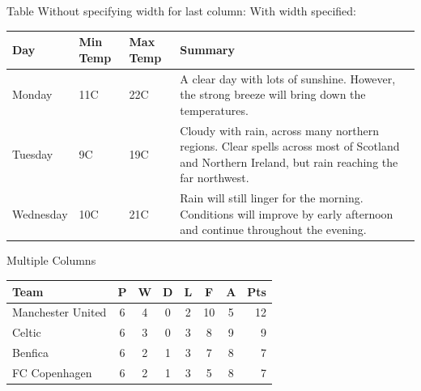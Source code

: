\documentclass[10pt,xcolor=table]{beamer}
\begin{document}
\begin{frame}{Table}
Without specifying width for last column:
With width specified:
\begin{center}
    \begin{tabular}{ | l | l | l | p{5cm} |}
    \hline
    Day & Min Temp & Max Temp & Summary \\ \hline
    Monday & 11C & 22C & A clear day with lots of sunshine.  
    However, the strong breeze will bring down the temperatures. \\ \hline
    Tuesday & 9C & 19C & Cloudy with rain, across many northern regions. Clear spells
    across most of Scotland and Northern Ireland,
    but rain reaching the far northwest. \\ \hline
    Wednesday & 10C & 21C & Rain will still linger for the morning.
    Conditions will improve by early afternoon and continue
    throughout the evening. \\
    \hline
    \end{tabular}
\end{center}
\end{frame}

\begin{frame}{Multiple Columns}
\begin{center}
\begin{tabular}{l*{6}{c}r}
Team              & P & W & D & L & F  & A & Pts \\
\hline
Manchester United & 6 & 4 & 0 & 2 & 10 & 5 & 12  \\
Celtic            & 6 & 3 & 0 & 3 &  8 & 9 &  9  \\
Benfica           & 6 & 2 & 1 & 3 &  7 & 8 &  7  \\
FC Copenhagen     & 6 & 2 & 1 & 3 &  5 & 8 &  7  \\
\end{tabular}
\end{center}
\end{frame}
\end{document}
